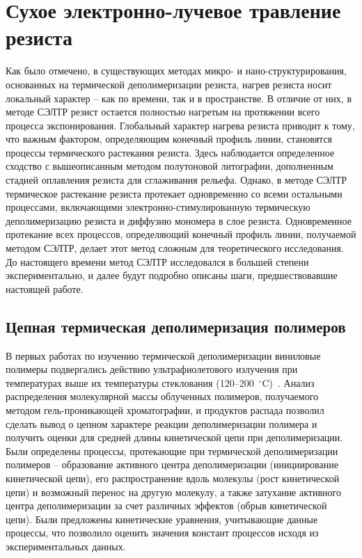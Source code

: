 \section{Сухое электронно-лучевое травление резиста}

Как было отмечено, в существующих методах микро- и нано-структурирования, основанных на термической деполимеризации резиста, нагрев резиста носит локальный характер -- как по времени, так и в пространстве. В отличие от них, в методе СЭЛТР резист остается полностью нагретым на протяжении всего процесса экспонирования. Глобальный характер нагрева резиста приводит к тому, что важным фактором, определяющим конечный профиль линии, становятся процессы термического растекания резиста. Здесь наблюдается определенное сходство с вышеописанным методом полутоновой литографии, дополненным стадией оплавления резиста для сглаживания рельефа. Однако, в методе СЭЛТР термическое растекание резиста протекает одновременно со всеми остальными процессами, включающими электронно-стимулированную термическую деполимеризацию резиста и диффузию мономера в слое резиста. Одновременное протекание всех процессов, определяющий конечный профиль линии, получаемой методом СЭЛТР, делает этот метод сложным для теоретического исследования. До настоящего времени метод СЭЛТР исследовался в большей степени экспериментально, и далее будут подробно описаны шаги, предшествовавшие настоящей работе.


\subsection{Цепная термическая деполимеризация полимеров}
В первых работах по изучению термической деполимеризации виниловые полимеры подвергались действию ультрафиолетового излучения при температурах выше их температуры стеклования (120--200~$^\circ$C)~\cite{Cowley_1952_1, Cowley_1952_2, Grassie1949_1, Grassie1949_2, Grassie1949_3, Grassie1949_4}.
Анализ распределения молекулярной массы облученных полимеров, получаемого методом гель-проникающей хроматографии, и продуктов распада позволил сделать вывод о цепном характере реакции деполимеризации полимера и получить оценки для средней длины кинетической цепи при деполимеризации.
Были определены процессы, протекающие при термической деполимеризации полимеров -- образование активного центра деполимеризации (инициирование кинетической цепи), его распространение вдоль молекулы (рост кинетической цепи) и возможный перенос на другую молекулу, а также затухание активного центра деполимеризации за счет различных эффектов (обрыв кинетической цепи).
Были предложены кинетические уравнения, учитывающие данные процессы, что позволило оценить значения констант процессов исходя из экспериментальных данных.

